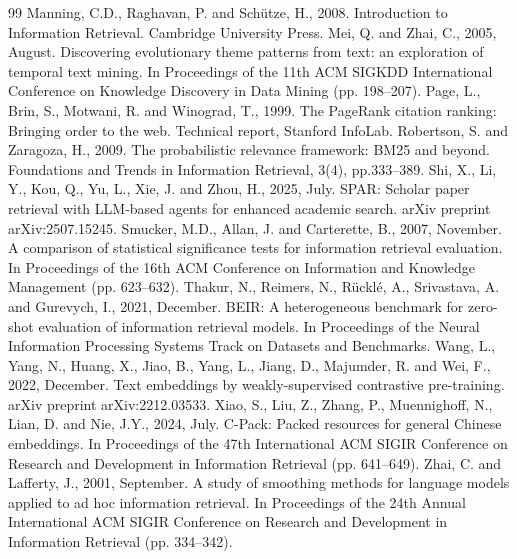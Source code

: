 \documentclass[10pt,twocolumn]{article}
\begin{document}
\begin{thebibliography}{99}
 Manning, C.D., Raghavan, P. and Sch\"utze, H., 2008. Introduction to Information Retrieval. Cambridge University Press.
 Mei, Q. and Zhai, C., 2005, August. Discovering evolutionary theme patterns from text: an exploration of temporal text mining. In Proceedings of the 11th ACM SIGKDD International Conference on Knowledge Discovery in Data Mining (pp. 198--207).
 Page, L., Brin, S., Motwani, R. and Winograd, T., 1999. The PageRank citation ranking: Bringing order to the web. Technical report, Stanford InfoLab.
 Robertson, S. and Zaragoza, H., 2009. The probabilistic relevance framework: BM25 and beyond. Foundations and Trends in Information Retrieval, 3(4), pp.333--389.
 Shi, X., Li, Y., Kou, Q., Yu, L., Xie, J. and Zhou, H., 2025, July. SPAR: Scholar paper retrieval with LLM-based agents for enhanced academic search. arXiv preprint arXiv:2507.15245.
 Smucker, M.D., Allan, J. and Carterette, B., 2007, November. A comparison of statistical significance tests for information retrieval evaluation. In Proceedings of the 16th ACM Conference on Information and Knowledge Management (pp. 623--632).
 Thakur, N., Reimers, N., R\"uckl\'e, A., Srivastava, A. and Gurevych, I., 2021, December. BEIR: A heterogeneous benchmark for zero-shot evaluation of information retrieval models. In Proceedings of the Neural Information Processing Systems Track on Datasets and Benchmarks.
 Wang, L., Yang, N., Huang, X., Jiao, B., Yang, L., Jiang, D., Majumder, R. and Wei, F., 2022, December. Text embeddings by weakly-supervised contrastive pre-training. arXiv preprint arXiv:2212.03533.
 Xiao, S., Liu, Z., Zhang, P., Muennighoff, N., Lian, D. and Nie, J.Y., 2024, July. C-Pack: Packed resources for general Chinese embeddings. In Proceedings of the 47th International ACM SIGIR Conference on Research and Development in Information Retrieval (pp. 641--649).
 Zhai, C. and Lafferty, J., 2001, September. A study of smoothing methods for language models applied to ad hoc information retrieval. In Proceedings of the 24th Annual International ACM SIGIR Conference on Research and Development in Information Retrieval (pp. 334--342).
\end{thebibliography}
\end{document}
